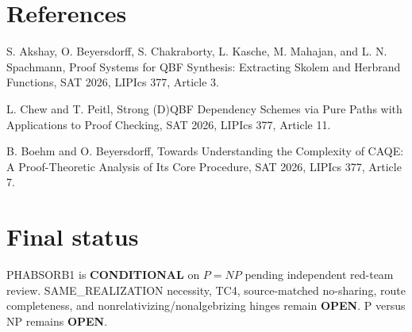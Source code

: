 \documentclass[11pt]{article}
\begin{document}
\section*{References}
S. Akshay, O. Beyersdorff, S. Chakraborty, L. Kasche, M. Mahajan, and L. N. Spachmann, Proof Systems for QBF Synthesis: Extracting Skolem and Herbrand Functions, SAT 2026, LIPIcs 377, Article 3.

L. Chew and T. Peitl, Strong (D)QBF Dependency Schemes via Pure Paths with Applications to Proof Checking, SAT 2026, LIPIcs 377, Article 11.

B. Boehm and O. Beyersdorff, Towards Understanding the Complexity of CAQE: A Proof-Theoretic Analysis of Its Core Procedure, SAT 2026, LIPIcs 377, Article 7.

\section*{Final status}
PHABSORB1 is \textbf{CONDITIONAL} on \(P=NP\) pending independent red-team review. SAME\_REALIZATION necessity, TC4, source-matched no-sharing, route completeness, and nonrelativizing/nonalgebrizing hinges remain \textbf{OPEN}. P versus NP remains \textbf{OPEN}.

\end{document}
